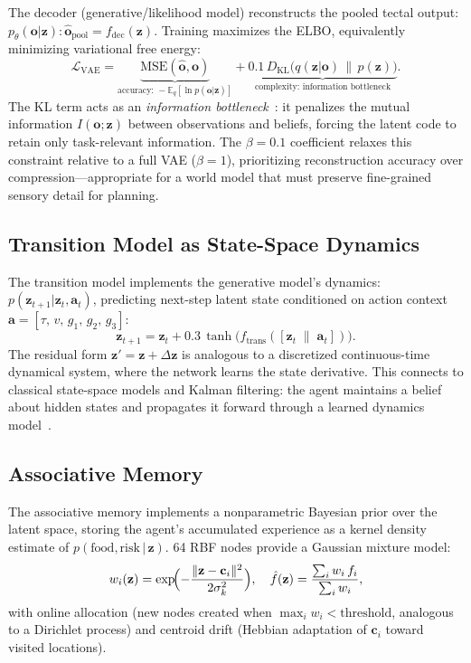 \documentclass[11pt,a4paper]{article}
\begin{document}
The decoder (generative/likelihood model) reconstructs the pooled tectal output:
$p_\theta(\mathbf{o}|\mathbf{z}): \hat{\mathbf{o}}_\text{pool} = f_\text{dec}(\mathbf{z})$.
Training maximizes the ELBO, equivalently minimizing variational free energy:
\begin{equation}\label{eq:elbo}
  \mathcal{L}_\text{VAE} =
    \underbrace{\text{MSE}(\hat{\mathbf{o}}, \mathbf{o})}_{\text{accuracy: } -\mathbb{E}_q[\ln p(\mathbf{o}|\mathbf{z})]}
    + \underbrace{0.1\,D_\text{KL}\!\bigl(q(\mathbf{z}|\mathbf{o})\,\|\,p(\mathbf{z})\bigr)}_{\text{complexity: information bottleneck}}.
\end{equation}
The KL term acts as an \emph{information bottleneck}~\cite{tishby2000}:
it penalizes the mutual information $I(\mathbf{o}; \mathbf{z})$ between
observations and beliefs, forcing the latent code to retain only
task-relevant information.
The $\beta = 0.1$ coefficient relaxes this constraint relative to a
full VAE ($\beta=1$), prioritizing reconstruction accuracy over
compression---appropriate for a world model that must preserve
fine-grained sensory detail for planning.

\subsection{Transition Model as State-Space Dynamics}

The transition model implements the generative model's dynamics:
$p(\mathbf{z}_{t+1}|\mathbf{z}_t, \mathbf{a}_t)$,
predicting next-step latent state conditioned on action context
$\mathbf{a} = [\tau,\, v,\, g_1,\, g_2,\, g_3]$:
\begin{equation}\label{eq:transition}
  \mathbf{z}_{t+1} = \mathbf{z}_t + 0.3\,\tanh\!\bigl(f_\text{trans}([\mathbf{z}_t\;\|\;\mathbf{a}_t])\bigr).
\end{equation}
The residual form $\mathbf{z}' = \mathbf{z} + \Delta\mathbf{z}$ is
analogous to a discretized continuous-time dynamical system, where the
network learns the state derivative.
This connects to classical state-space models and Kalman filtering:
the agent maintains a belief about hidden states and propagates it
forward through a learned dynamics model~\cite{friston2010}.

\subsection{Associative Memory}

The associative memory implements a nonparametric Bayesian prior over the
latent space, storing the agent's accumulated experience as a kernel density
estimate of $p(\text{food}, \text{risk}\,|\,\mathbf{z})$.
64 RBF nodes provide a Gaussian mixture model:
\begin{equation}\label{eq:assoc_mem}
  w_i(\mathbf{z}) = \exp\!\Bigl(-\frac{\|\mathbf{z} - \mathbf{c}_i\|^2}{2\sigma_k^2}\Bigr),
  \quad
  \hat{f}(\mathbf{z}) = \frac{\sum_i w_i\,f_i}{\sum_i w_i},
\end{equation}
with online allocation (new nodes created when
$\max_i w_i < \text{threshold}$, analogous to a Dirichlet process) and
centroid drift (Hebbian adaptation of $\mathbf{c}_i$ toward visited
locations).
\end{document}
